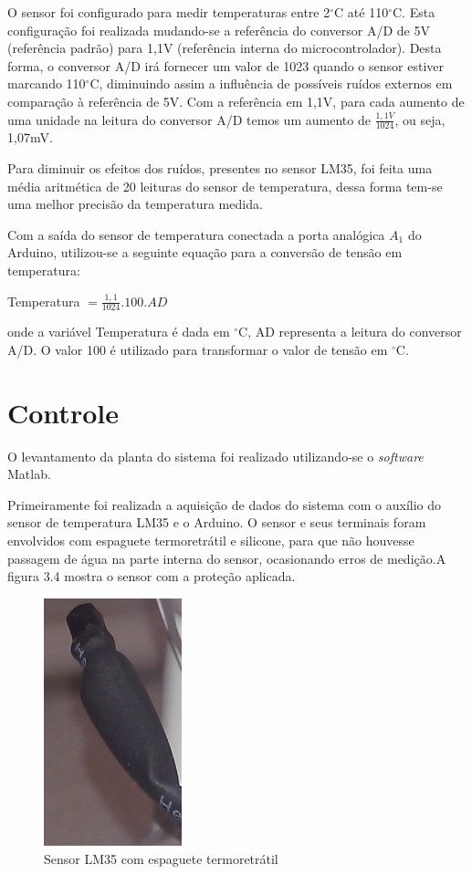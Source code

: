 O sensor foi configurado para medir temperaturas entre 2$^\circ$C até 110$^\circ$C. Esta configuração foi realizada mudando-se a referência do conversor A/D de 5V (referência padrão) para 1,1V (referência interna do microcontrolador). Desta forma, o conversor A/D irá fornecer um valor de 1023 quando o sensor estiver marcando 110$^\circ$C, diminuindo assim a influência de possíveis ruídos externos em comparação à referência de 5V. Com a referência em 1,1V, para cada aumento de uma unidade na leitura do conversor A/D temos um aumento de $\frac{1,1V}{1024}$, ou seja, 1,07mV.

Para diminuir os efeitos dos ruídos, presentes no sensor LM35, foi feita uma média aritmética de 20 leituras do sensor de temperatura, dessa forma tem-se uma melhor precisão da temperatura medida.

Com a saída do sensor de temperatura conectada a porta analógica $A_1$ do Arduino, utilizou-se a seguinte equação para a conversão de tensão em temperatura:

\begin{center}
Temperatura $ = \frac{1,1}{1024}.100.AD$
\end{center}
\noindent onde a variável Temperatura é dada em $^\circ$C, AD representa a leitura do conversor A/D. O valor 100 é utilizado para transformar o valor de tensão em $^\circ$C.

\section{Controle}
O levantamento da planta do sistema foi realizado utilizando-se o \textit{software} Matlab. 

Primeiramente foi realizada a aquisição de dados do sistema com o auxílio do sensor de temperatura LM35 e o Arduino. O sensor e seus terminais foram envolvidos com espaguete termoretrátil e silicone, para que não houvesse passagem de água na parte interna do sensor, ocasionando erros de medição.A figura 3.4 mostra o sensor com a proteção aplicada.
\begin{figure}[!htb]

\center

\includegraphics[width=4cm]{imagens/lm35_termoretratil.jpg}

\label{Sensor LM35 com espaguete termoretrátil}

\caption{Sensor LM35 com espaguete termoretrátil}

\end{figure}

